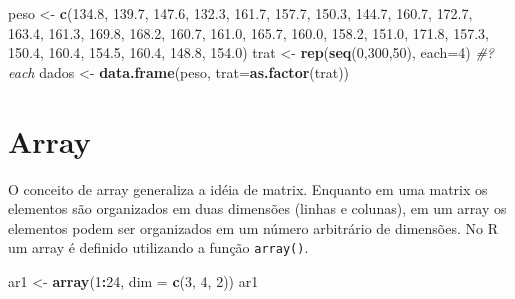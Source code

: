 \documentclass[
]{book}
\newenvironment{Shaded}{\begin{snugshade}}{\end{snugshade}}
\newcommand{\CommentTok}[1]{\textcolor[rgb]{0.56,0.35,0.01}{\textit{#1}}}
\newcommand{\DataTypeTok}[1]{\textcolor[rgb]{0.13,0.29,0.53}{#1}}
\newcommand{\DecValTok}[1]{\textcolor[rgb]{0.00,0.00,0.81}{#1}}
\newcommand{\FloatTok}[1]{\textcolor[rgb]{0.00,0.00,0.81}{#1}}
\newcommand{\KeywordTok}[1]{\textcolor[rgb]{0.13,0.29,0.53}{\textbf{#1}}}
\newcommand{\NormalTok}[1]{#1}
\newcommand{\OperatorTok}[1]{\textcolor[rgb]{0.81,0.36,0.00}{\textbf{#1}}}
\newcommand{\StringTok}[1]{\textcolor[rgb]{0.31,0.60,0.02}{#1}}
\begin{document}
\begin{Shaded}
\begin{Highlighting}[]
\NormalTok{peso  <-}\StringTok{ }\KeywordTok{c}\NormalTok{(}\FloatTok{134.8}\NormalTok{, }\FloatTok{139.7}\NormalTok{, }\FloatTok{147.6}\NormalTok{, }\FloatTok{132.3}\NormalTok{, }\FloatTok{161.7}\NormalTok{, }\FloatTok{157.7}\NormalTok{, }\FloatTok{150.3}\NormalTok{, }\FloatTok{144.7}\NormalTok{,}
           \FloatTok{160.7}\NormalTok{, }\FloatTok{172.7}\NormalTok{, }\FloatTok{163.4}\NormalTok{, }\FloatTok{161.3}\NormalTok{, }\FloatTok{169.8}\NormalTok{, }\FloatTok{168.2}\NormalTok{, }\FloatTok{160.7}\NormalTok{, }\FloatTok{161.0}\NormalTok{,}
           \FloatTok{165.7}\NormalTok{, }\FloatTok{160.0}\NormalTok{, }\FloatTok{158.2}\NormalTok{, }\FloatTok{151.0}\NormalTok{, }\FloatTok{171.8}\NormalTok{, }\FloatTok{157.3}\NormalTok{, }\FloatTok{150.4}\NormalTok{, }\FloatTok{160.4}\NormalTok{,}
           \FloatTok{154.5}\NormalTok{, }\FloatTok{160.4}\NormalTok{, }\FloatTok{148.8}\NormalTok{, }\FloatTok{154.0}\NormalTok{)}
\NormalTok{trat  <-}\StringTok{ }\KeywordTok{rep}\NormalTok{(}\KeywordTok{seq}\NormalTok{(}\DecValTok{0}\NormalTok{,}\DecValTok{300}\NormalTok{,}\DecValTok{50}\NormalTok{), }\DataTypeTok{each=}\DecValTok{4}\NormalTok{)  }\CommentTok{#?each}
\NormalTok{dados <-}\StringTok{  }\KeywordTok{data.frame}\NormalTok{(peso, }\DataTypeTok{trat=}\KeywordTok{as.factor}\NormalTok{(trat))}
\end{Highlighting}
\end{Shaded}

\hypertarget{array}{%
\section{Array}\label{array}}

O conceito de array generaliza a idéia de matrix. Enquanto em uma matrix os elementos são organizados em duas dimensões (linhas e colunas), em um array os elementos podem ser organizados em um número arbitrário de dimensões.
No R um array é definido utilizando a função \texttt{array()}.

\begin{Shaded}
\begin{Highlighting}[]
\NormalTok{ar1 <-}\StringTok{ }\KeywordTok{array}\NormalTok{(}\DecValTok{1}\OperatorTok{:}\DecValTok{24}\NormalTok{, }\DataTypeTok{dim =} \KeywordTok{c}\NormalTok{(}\DecValTok{3}\NormalTok{, }\DecValTok{4}\NormalTok{, }\DecValTok{2}\NormalTok{)) }
\NormalTok{ar1}
\end{Highlighting}
\end{Shaded}
\end{document}
